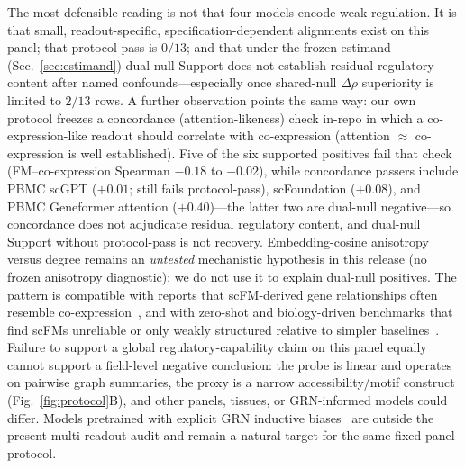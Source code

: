 \documentclass[fleqn,10pt,lineno]{wlpeerj}
\begin{document}
The most defensible reading is not that four models encode weak regulation. It is that small,
readout-specific, specification-dependent alignments exist on this panel; that protocol-pass is
$0/13$; and that under the frozen estimand (Sec.~\ref{sec:estimand}) dual-null Support does not
establish residual regulatory content after named confounds---especially once shared-null
$\Delta\rho$ superiority is limited to $2/13$ rows. A further observation points the same way: our own protocol
freezes a concordance (attention-likeness) check in-repo in which a co-expression-like readout
should correlate with co-expression (attention $\approx$ co-expression is well established). Five of
the six supported positives fail that check (FM--co-expression Spearman $-0.18$ to $-0.02$), while
concordance passers include PBMC scGPT ($+0.01$; still fails protocol-pass), scFoundation ($+0.08$),
and PBMC Geneformer attention ($+0.40$)---the latter two are dual-null negative---so concordance does
not adjudicate residual regulatory content, and dual-null Support without protocol-pass is not
recovery. Embedding-cosine anisotropy versus degree remains an
\emph{untested} mechanistic hypothesis in this release (no frozen anisotropy diagnostic); we do not
use it to explain dual-null positives. The pattern is compatible with reports that scFM-derived gene
relationships often resemble
co-expression~\citep{kendiukhov2026scfm,kendiukhov2026sae}, and with zero-shot and biology-driven
benchmarks that find scFMs unreliable or only weakly structured relative to simpler
baselines~\citep{kedzierska2023assessing,wu2025biologydriven,qiu2025biollm}. Failure to support a
global regulatory-capability claim on this panel equally cannot support a field-level negative
conclusion: the probe is linear and operates on pairwise graph summaries, the proxy is a narrow
accessibility/motif construct (Fig.~\ref{fig:protocol}B), and other panels, tissues, or GRN-informed
models could differ.
Models pretrained with explicit GRN inductive biases~\citep{yang2024genecompass,kalfon2025scprint,hu2026regformer}
are outside the present multi-readout audit and remain a natural target for the same fixed-panel
protocol.
\end{document}
